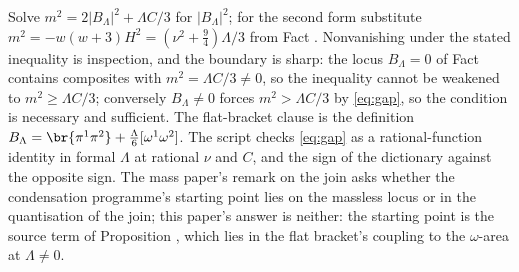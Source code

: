 Solve $m^{2} = 2|B_{\Lambda}|^{2} + \Lambda C/3$ for $|B_{\Lambda}|^{2}$; for the second form substitute $m^{2} = -w(w+3)H^{2} = (\nu^{2} + \tfrac94)\Lambda/3$ from Fact . Nonvanishing under the stated inequality is inspection, and the boundary is sharp: the locus $B_{\Lambda} = 0$ of Fact  contains composites with $m^{2} = \Lambda C/3 \ne 0$, so the inequality cannot be weakened to $m^{2} \ge \Lambda C/3$; conversely $B_{\Lambda} \ne 0$ forces $m^{2} > \Lambda C/3$ by \eqref{eq:gap}, so the condition is necessary and sufficient. The flat-bracket clause is the definition $B_{\Lambda} = \br{\pi^{1}\pi^{2}} + \tfrac{\Lambda}{6}[\omega^{1}\omega^{2}]$. The script checks \eqref{eq:gap} as a rational-function identity in formal $\Lambda$ at rational $\nu$ and $C$, and the sign of the dictionary against the opposite sign. The mass paper's remark on the join \cite[Rem.~5.10]{ButlerT11} asks whether the condensation programme's starting point lies on the massless locus or in the quantisation of the join; this paper's answer is neither: the starting point is the source term of Proposition , which lies in the flat bracket's coupling to the $\omega$-area at $\Lambda \ne 0$.
